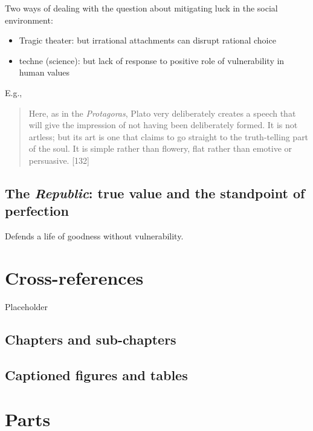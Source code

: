 \documentclass[
]{book}
\providecommand{\tightlist}{%
  \setlength{\itemsep}{0pt}\setlength{\parskip}{0pt}}
\begin{document}
Two ways of dealing with the question about mitigating luck in the social environment:

\begin{itemize}
\tightlist
\item
  Tragic theater: but irrational attachments can disrupt rational choice
\item
  techne (science): but lack of response to positive role of vulnerability in human values
\end{itemize}

E.g.,

\begin{quote}
Here, as in the \emph{Protagoras}, Plato very deliberately creates a speech that will give the impression of not having been deliberately formed. It is not artless; but its art is one that claims to go straight to the truth-telling part of the soul. It is simple rather than flowery, flat rather than emotive or persuasive. {[}132{]}
\end{quote}

\section{\texorpdfstring{The \emph{Republic}: true value and the standpoint of perfection}{The Republic: true value and the standpoint of perfection}}\label{the-republic-true-value-and-the-standpoint-of-perfection}

Defends a life of goodness without vulnerability.

\chapter{Cross-references}\label{cross}

Placeholder

\section{Chapters and sub-chapters}\label{chapters-and-sub-chapters}

\section{Captioned figures and tables}\label{captioned-figures-and-tables}

\chapter{Parts}\label{parts}
\end{document}
